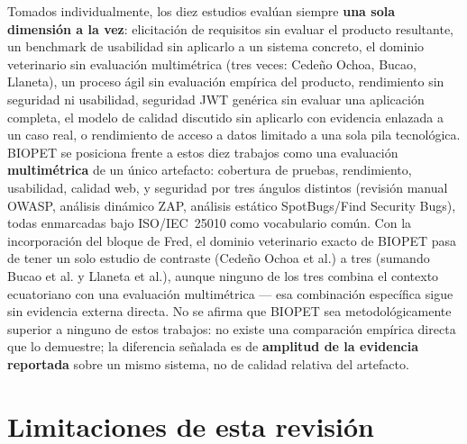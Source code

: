 Tomados individualmente, los diez estudios eval\'uan siempre \textbf{una
sola dimensi\'on a la vez}: elicitaci\'on de requisitos sin evaluar el
producto resultante, un benchmark de usabilidad sin aplicarlo a un sistema
concreto, el dominio veterinario sin evaluaci\'on multim\'etrica (tres
veces: Cede\~no Ochoa, Bucao, Llaneta), un proceso \'agil sin evaluaci\'on
emp\'irica del producto, rendimiento sin seguridad ni usabilidad, seguridad
JWT gen\'erica sin evaluar una aplicaci\'on completa, el modelo de calidad
discutido sin aplicarlo con evidencia enlazada a un caso real, o
rendimiento de acceso a datos limitado a una sola pila tecnol\'ogica.
BIOPET se posiciona frente a estos diez trabajos como una evaluaci\'on
\textbf{multim\'etrica} de un \'unico artefacto: cobertura de pruebas,
rendimiento, usabilidad, calidad web, y seguridad por tres \'angulos
distintos (revisi\'on manual OWASP, an\'alisis din\'amico ZAP, an\'alisis
est\'atico SpotBugs/Find Security Bugs), todas enmarcadas bajo
ISO/IEC~25010 como vocabulario com\'un. Con la incorporaci\'on del bloque
de Fred, el dominio veterinario exacto de BIOPET pasa de tener un solo
estudio de contraste (Cede\~no Ochoa et al.) a tres (sumando Bucao et al. y
Llaneta et al.), aunque ninguno de los tres combina el contexto
ecuatoriano con una evaluaci\'on multim\'etrica --- esa combinaci\'on
espec\'ifica sigue sin evidencia externa directa. No se afirma que BIOPET
sea metodol\'ogicamente superior a ninguno de estos trabajos: no existe una
comparaci\'on emp\'irica directa que lo demuestre; la diferencia se\~nalada
es de \textbf{amplitud de la evidencia reportada} sobre un mismo sistema,
no de calidad relativa del artefacto.

\section{Limitaciones de esta revisi\'on}
\label{sec:limitaciones-trabajos-relacionados}

